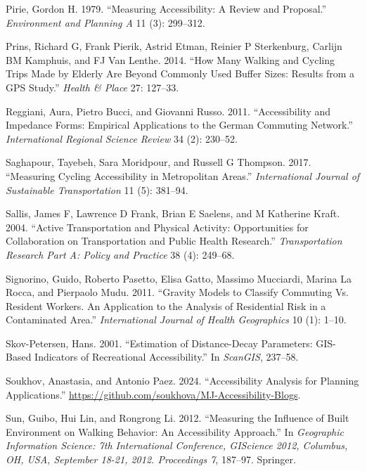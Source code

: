 \documentclass[preprint, 3p,
authoryear]{elsarticle} %
\newlength{\cslhangindent}
\newenvironment{CSLReferences}[2] %
 {\begin{list}{}{%
  \setlength{\itemindent}{0pt}
  \setlength{\leftmargin}{0pt}
  \setlength{\parsep}{0pt}
  \ifodd #1
   \setlength{\leftmargin}{\cslhangindent}
   \setlength{\itemindent}{-1\cslhangindent}
  \fi
  \setlength{\itemsep}{#2\baselineskip}}}
 {\end{list}}
\begin{document}
\begin{CSLReferences}{1}{0}
Pirie, Gordon H. 1979. {``Measuring Accessibility: A Review and
Proposal.''} \emph{Environment and Planning A} 11 (3): 299--312.

Prins, Richard G, Frank Pierik, Astrid Etman, Reinier P Sterkenburg,
Carlijn BM Kamphuis, and FJ Van Lenthe. 2014. {``How Many Walking and
Cycling Trips Made by Elderly Are Beyond Commonly Used Buffer Sizes:
Results from a GPS Study.''} \emph{Health \& Place} 27: 127--33.

Reggiani, Aura, Pietro Bucci, and Giovanni Russo. 2011. {``Accessibility
and Impedance Forms: Empirical Applications to the German Commuting
Network.''} \emph{International Regional Science Review} 34 (2):
230--52.

Saghapour, Tayebeh, Sara Moridpour, and Russell G Thompson. 2017.
{``Measuring Cycling Accessibility in Metropolitan Areas.''}
\emph{International Journal of Sustainable Transportation} 11 (5):
381--94.

Sallis, James F, Lawrence D Frank, Brian E Saelens, and M Katherine
Kraft. 2004. {``Active Transportation and Physical Activity:
Opportunities for Collaboration on Transportation and Public Health
Research.''} \emph{Transportation Research Part A: Policy and Practice}
38 (4): 249--68.

Signorino, Guido, Roberto Pasetto, Elisa Gatto, Massimo Mucciardi,
Marina La Rocca, and Pierpaolo Mudu. 2011. {``Gravity Models to Classify
Commuting Vs. Resident Workers. An Application to the Analysis of
Residential Risk in a Contaminated Area.''} \emph{International Journal
of Health Geographics} 10 (1): 1--10.

Skov-Petersen, Hans. 2001. {``Estimation of Distance-Decay Parameters:
GIS-Based Indicators of Recreational Accessibility.''} In
\emph{ScanGIS}, 237--58.

Soukhov, Anastasia, and Antonio Paez. 2024. {``Accessibility Analysis
for Planning Applications.''}
\url{https://github.com/soukhova/MJ-Accessibility-Blogs}.

Sun, Guibo, Hui Lin, and Rongrong Li. 2012. {``Measuring the Influence
of Built Environment on Walking Behavior: An Accessibility Approach.''}
In \emph{Geographic Information Science: 7th International Conference,
GIScience 2012, Columbus, OH, USA, September 18-21, 2012. Proceedings
7}, 187--97. Springer.


\end{CSLReferences}
\end{document}
